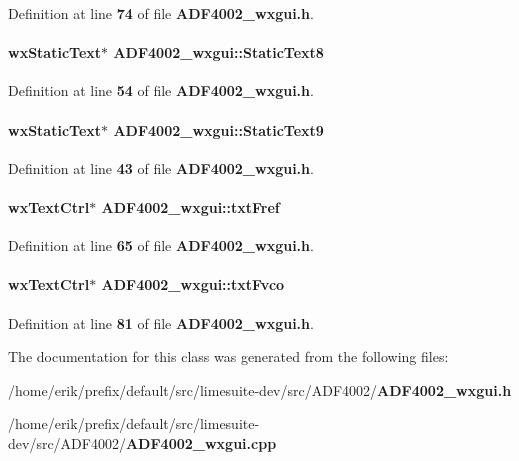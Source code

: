 Definition at line {\bf 74} of file {\bf A\+D\+F4002\+\_\+wxgui.\+h}.

\paragraph[{Static\+Text8}]{\setlength{\rightskip}{0pt plus 5cm}wx\+Static\+Text$\ast$ A\+D\+F4002\+\_\+wxgui\+::\+Static\+Text8}\label{classADF4002__wxgui_acc9867ac94c4f6d7760553b320790046}


Definition at line {\bf 54} of file {\bf A\+D\+F4002\+\_\+wxgui.\+h}.

\paragraph[{Static\+Text9}]{\setlength{\rightskip}{0pt plus 5cm}wx\+Static\+Text$\ast$ A\+D\+F4002\+\_\+wxgui\+::\+Static\+Text9}\label{classADF4002__wxgui_a900dfeb9917a285116d292408e13ea03}


Definition at line {\bf 43} of file {\bf A\+D\+F4002\+\_\+wxgui.\+h}.

\paragraph[{txt\+Fref}]{\setlength{\rightskip}{0pt plus 5cm}wx\+Text\+Ctrl$\ast$ A\+D\+F4002\+\_\+wxgui\+::txt\+Fref}\label{classADF4002__wxgui_a6b205eb41cb3b56561d7db9ffd61d2d2}


Definition at line {\bf 65} of file {\bf A\+D\+F4002\+\_\+wxgui.\+h}.

\paragraph[{txt\+Fvco}]{\setlength{\rightskip}{0pt plus 5cm}wx\+Text\+Ctrl$\ast$ A\+D\+F4002\+\_\+wxgui\+::txt\+Fvco}\label{classADF4002__wxgui_abd7cf72a848843281738286a56b2d206}


Definition at line {\bf 81} of file {\bf A\+D\+F4002\+\_\+wxgui.\+h}.



The documentation for this class was generated from the following files\+:\begin{DoxyCompactItemize}
\item 
/home/erik/prefix/default/src/limesuite-\/dev/src/\+A\+D\+F4002/{\bf A\+D\+F4002\+\_\+wxgui.\+h}\item 
/home/erik/prefix/default/src/limesuite-\/dev/src/\+A\+D\+F4002/{\bf A\+D\+F4002\+\_\+wxgui.\+cpp}\end{DoxyCompactItemize}
